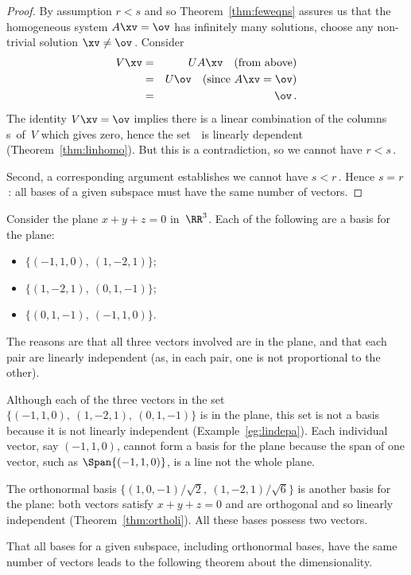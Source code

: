 \begin{proof}
By assumption \(r<s\) and so Theorem~\ref{thm:feweqns} assures us that the homogeneous system \(A\xv=\ov\) has infinitely many solutions, choose any non-trivial solution \(\xv\neq\ov\)\,.
Consider 
\begin{eqnarray*}
V\xv&=& UA\xv\quad(\text{from above})
\\&=&U\ov\quad(\text{since }A\xv=\ov)
\\&=&\ov\,.
\end{eqnarray*}
The identity \(V\xv=\ov\) implies there is a linear combination of the columns \hlist\vv s\ of~\(V\) which gives zero, hence the set~\cV\ is linearly dependent (Theorem~\ref{thm:linhomo}).  
But this is a contradiction, so we cannot have \(r<s\)\,.

Second, a corresponding argument establishes we cannot have \(s<r\)\,.
Hence \(s=r\)\,: all bases of a given subspace must have the same number of vectors.
\end{proof}



\begin{example} \label{eg:samedi}
Consider the plane \(x+y+z=0\) in~\(\RR^3\).
Each of the following are a basis for the plane:
\begin{itemize}
\item \(\{(-1,1,0),\ (1,-2,1)\}\);
\item \(\{(1,-2,1),\ (0,1,-1)\}\); 
\item \(\{(0,1,-1),\ (-1,1,0)\}\).
\end{itemize}
The reasons are that all three vectors involved are in the plane, and that each pair are linearly independent (as, in each pair, one is not proportional to the other).

Although each of the three vectors in the set \(\{(-1,1,0),\ (1,-2,1),\ (0,1,-1)\}\) is in the plane, this set is not a basis because it is not linearly independent (Example~\ref{eg:lindepa}).
Each individual vector, say \((-1,1,0)\), cannot form a basis for the plane because the span of one vector, such as \(\Span\{(-1,1,0)\}\), is a line not the whole plane.

The orthonormal basis \(\big\{(1,0,-1)/\sqrt2,\ (1,-2,1)/\sqrt6\big\}\) is another basis for the plane: both vectors satisfy \(x+y+z=0\) and are orthogonal and so linearly independent (Theorem~\ref{thm:ortholi}).  
All these bases possess two vectors.
\end{example}

That all bases for a given subspace, including orthonormal bases, have the same number of vectors leads to the following theorem about the dimensionality.

